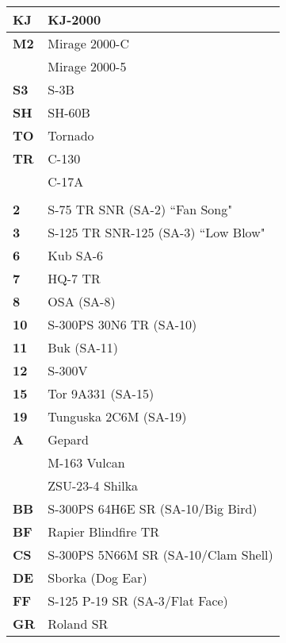 \documentclass[8pt,usenames,dvipsnames,twoside]{article}
\begin{document}
\begin{multicols*}{2}
\begin{center}
\begin{tabular}{l | p{4cm}}
			\end{tabular}
		\end{center}
		\begin{center}
			\begin{tabular}{l | p{4cm}}
				\textbf{KJ} & KJ-2000 \\
				\midrule
				\textbf{M2} & Mirage 2000-C \\
				& Mirage 2000-5 \\
				\midrule
				\textbf{S3} & S-3B \\
				\midrule
				\textbf{SH} & SH-60B \\
				\midrule
				\textbf{TO} & Tornado \\
				\midrule
				\textbf{TR} & C-130 \\
				& C-17A \\
				\toprule
				\multicolumn{2}{c}{\blue{AIR DEFENSE}} \\
				\toprule
				\textbf{2} & S-75 TR SNR (SA-2) ``Fan Song" \\
				\midrule
				\textbf{3} & S-125 TR SNR-125 (SA-3) ``Low Blow" \\
				\midrule
				\textbf{6} & Kub SA-6 \\
				\midrule
				\textbf{7} & HQ-7 TR \\
				\midrule
				\textbf{8} & OSA (SA-8) \\
				\midrule
				\textbf{10} & S-300PS 30N6 TR (SA-10) \\
				\midrule
				\textbf{11} & Buk (SA-11) \\
				\midrule
				\textbf{12} & S-300V \\
				\midrule
				\textbf{15} & Tor 9A331 (SA-15) \\
				\midrule
				\textbf{19} & Tunguska 2C6M (SA-19) \\
				\midrule
				\textbf{A} & Gepard \\
				& M-163 Vulcan \\
				& ZSU-23-4 Shilka \\
				\midrule
				\textbf{BB} & S-300PS 64H6E SR (SA-10/Big Bird) \\
				\midrule
				\textbf{BF} & Rapier Blindfire TR \\
				\midrule
				\textbf{CS} & S-300PS 5N66M SR (SA-10/Clam Shell) \\
				\midrule
				\textbf{DE} & Sborka (Dog Ear) \\
				\midrule
				\textbf{FF} & S-125 P-19 SR (SA-3/Flat Face) \\
				\midrule
				\textbf{GR} & Roland SR \\

\end{tabular}
\end{center}
\end{multicols*}
\end{document}
